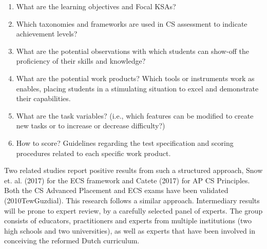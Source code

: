 \begin{enumerate}
\item What are the learning objectives and Focal KSAs?
\item Which taxonomies and frameworks are used in CS assessment to indicate achievement levels?
\item What are the potential observations with which students can show-off the proficiency of their skills and knowledge?
\item What are the potential work products? Which tools or instruments work as enables, placing students in a stimulating situation to excel and demonstrate their capabilities.
\item What are the task variables? (i.e., which features can be modified to create new tasks or to increase or decrease difficulty?)
\item How to score? Guidelines regarding the test specification and scoring procedures related to each specific work product.
\end{enumerate}





Two related studies report positive results from such a structured approach, Snow et. al. (2017) for the ECS framework and Catete (2017) for AP CS Principles. Both the CS Advanced Placement and ECS exams have been validated (2010TewGuzdial). This research follows a similar approach. Intermediary results will be prone to expert review, by a carefully selected panel of experts. The group consists of educators, practitioners and experts from multiple institutions (two high schools and two universities), as well as experts that have been involved in conceiving the reformed Dutch curriculum.

